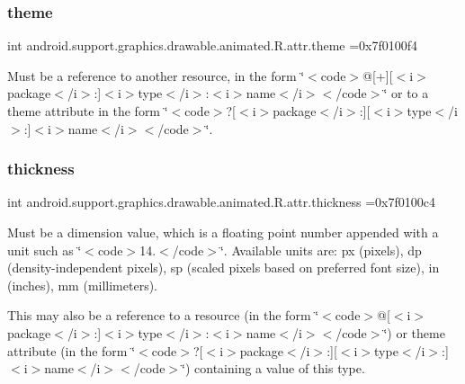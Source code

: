 \subsubsection{\texorpdfstring{theme}{theme}}
{\footnotesize\ttfamily int android.\+support.\+graphics.\+drawable.\+animated.\+R.\+attr.\+theme =0x7f0100f4\hspace{0.3cm}{\ttfamily [static]}}

Must be a reference to another resource, in the form \char`\"{}$<$code$>$@\mbox{[}+\mbox{]}\mbox{[}$<$i$>$package$<$/i$>$\+:\mbox{]}$<$i$>$type$<$/i$>$\+:$<$i$>$name$<$/i$>$$<$/code$>$\char`\"{} or to a theme attribute in the form \char`\"{}$<$code$>$?\mbox{[}$<$i$>$package$<$/i$>$\+:\mbox{]}\mbox{[}$<$i$>$type$<$/i$>$\+:\mbox{]}$<$i$>$name$<$/i$>$$<$/code$>$\char`\"{}. \mbox{\label{classandroid_1_1support_1_1graphics_1_1drawable_1_1animated_1_1R_1_1attr_af049de530874dfe80a4b1d41fd6d34ce}} 
\subsubsection{\texorpdfstring{thickness}{thickness}}
{\footnotesize\ttfamily int android.\+support.\+graphics.\+drawable.\+animated.\+R.\+attr.\+thickness =0x7f0100c4\hspace{0.3cm}{\ttfamily [static]}}

Must be a dimension value, which is a floating point number appended with a unit such as \char`\"{}$<$code$>$14.\+5sp$<$/code$>$\char`\"{}. Available units are\+: px (pixels), dp (density-\/independent pixels), sp (scaled pixels based on preferred font size), in (inches), mm (millimeters). 

This may also be a reference to a resource (in the form \char`\"{}$<$code$>$@\mbox{[}$<$i$>$package$<$/i$>$\+:\mbox{]}$<$i$>$type$<$/i$>$\+:$<$i$>$name$<$/i$>$$<$/code$>$\char`\"{}) or theme attribute (in the form \char`\"{}$<$code$>$?\mbox{[}$<$i$>$package$<$/i$>$\+:\mbox{]}\mbox{[}$<$i$>$type$<$/i$>$\+:\mbox{]}$<$i$>$name$<$/i$>$$<$/code$>$\char`\"{}) containing a value of this type. \mbox{\label{classandroid_1_1support_1_1graphics_1_1drawable_1_1animated_1_1R_1_1attr_a0bce67ac2b5dbccef8d521c8a0bfab47}} 
